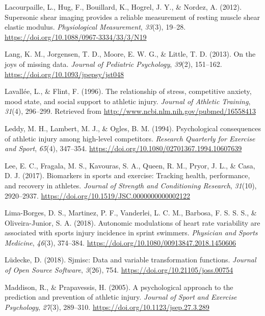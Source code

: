 \documentclass[man,floatsintext]{apa6}
\begin{document}
\leavevmode\hypertarget{ref-Lacourpaille2012}{}%
Lacourpaille, L., Hug, F., Bouillard, K., Hogrel, J. Y., \& Nordez, A. (2012). Supersonic shear imaging provides a reliable measurement of resting muscle shear elastic modulus. \emph{Physiological Measurement}, \emph{33}(3), 19--28. \url{https://doi.org/10.1088/0967-3334/33/3/N19}

\leavevmode\hypertarget{ref-Lang2014}{}%
Lang, K. M., Jorgensen, T. D., Moore, E. W. G., \& Little, T. D. (2013). On the joys of missing data. \emph{Journal of Pediatric Psychology}, \emph{39}(2), 151--162. \url{https://doi.org/10.1093/jpepsy/jst048}

\leavevmode\hypertarget{ref-Lavallee1996}{}%
Lavallée, L., \& Flint, F. (1996). The relationship of stress, competitive anxiety, mood state, and social support to athletic injury. \emph{Journal of Athletic Training}, \emph{31}(4), 296--299. Retrieved from \url{http://www.ncbi.nlm.nih.gov/pubmed/16558413}

\leavevmode\hypertarget{ref-Leddy1994}{}%
Leddy, M. H., Lambert, M. J., \& Ogles, B. M. (1994). Psychological consequences of athletic injury among high-level competitors. \emph{Research Quarterly for Exercise and Sport}, \emph{65}(4), 347--354. \url{https://doi.org/10.1080/02701367.1994.10607639}

\leavevmode\hypertarget{ref-Lee2017}{}%
Lee, E. C., Fragala, M. S., Kavouras, S. A., Queen, R. M., Pryor, J. L., \& Casa, D. J. (2017). Biomarkers in sports and exercise: Tracking health, performance, and recovery in athletes. \emph{Journal of Strength and Conditioning Research}, \emph{31}(10), 2920--2937. \url{https://doi.org/10.1519/JSC.0000000000002122}

\leavevmode\hypertarget{ref-Lima-Borges2018}{}%
Lima-Borges, D. S., Martinez, P. F., Vanderlei, L. C. M., Barbosa, F. S. S. S., \& Oliveira-Junior, S. A. (2018). Autonomic modulations of heart rate variability are associated with sports injury incidence in sprint swimmers. \emph{Physician and Sports Medicine}, \emph{46}(3), 374--384. \url{https://doi.org/10.1080/00913847.2018.1450606}

\leavevmode\hypertarget{ref-R-sjmisc}{}%
Lüdecke, D. (2018). Sjmisc: Data and variable transformation functions. \emph{Journal of Open Source Software}, \emph{3}(26), 754. \url{https://doi.org/10.21105/joss.00754}

\leavevmode\hypertarget{ref-Maddison2005}{}%
Maddison, R., \& Prapavessis, H. (2005). A psychological approach to the prediction and prevention of athletic injury. \emph{Journal of Sport and Exercise Psychology}, \emph{27}(3), 289--310. \url{https://doi.org/10.1123/jsep.27.3.289}
\end{document}
